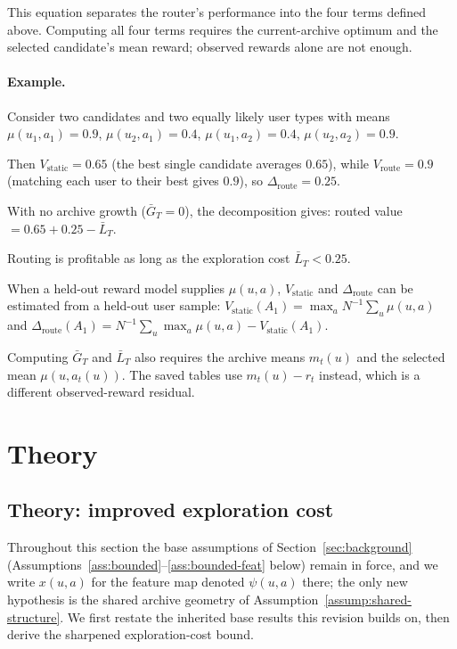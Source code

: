 \documentclass{article} %
\begin{document}
This equation separates the router's performance into the four terms defined
above. Computing all four terms requires the current-archive optimum and the
selected candidate's mean reward; observed rewards alone are not enough.

\paragraph{Example.} Consider two candidates and two equally likely user types with means $\mu(u_1,a_1)=0.9$, $\mu(u_2,a_1)=0.4$, $\mu(u_1,a_2)=0.4$, $\mu(u_2,a_2)=0.9$.

Then $V_{\mathrm{static}}=0.65$ (the best single candidate averages $0.65$), while $V_{\mathrm{route}}=0.9$ (matching each user to their best gives $0.9$), so $\Delta_{\mathrm{route}}=0.25$.

With no archive growth ($\bar G_T=0$), the decomposition gives: routed value $= 0.65 + 0.25 - \bar L_T$.

Routing is profitable as long as the exploration cost $\bar L_T < 0.25$.

When a held-out reward model supplies \(\mu(u,a)\),
\(V_{\mathrm{static}}\) and \(\Delta_{\mathrm{route}}\) can be estimated from a
held-out user sample:
\(V_{\mathrm{static}}(A_1)=\max_a N^{-1}\sum_u\mu(u,a)\) and
\(\Delta_{\mathrm{route}}(A_1)
=N^{-1}\sum_u\max_a\mu(u,a)-V_{\mathrm{static}}(A_1)\).

Computing \(\bar G_T\) and \(\bar L_T\) also requires the archive means
\(m_t(u)\) and the selected mean \(\mu(u,a_t(u))\). The saved tables use
\(m_t(u)-r_t\) instead, which is a different observed-reward residual.

\section{Theory}
\label{sec:hyper-theory}
\label{sec:theory}



\subsection{Theory: improved exploration cost}

\label{sec:method-assump}

Throughout this section the base assumptions of Section~\ref{sec:background} (Assumptions~\ref{ass:bounded}--\ref{ass:bounded-feat} below) remain in force, and we write $x(u,a)$ for the feature map denoted $\psi(u,a)$ there; the only new hypothesis is the shared archive geometry of Assumption~\ref{assump:shared-structure}. We first restate the inherited base results this revision builds on, then derive the sharpened exploration-cost bound.
\end{document}
